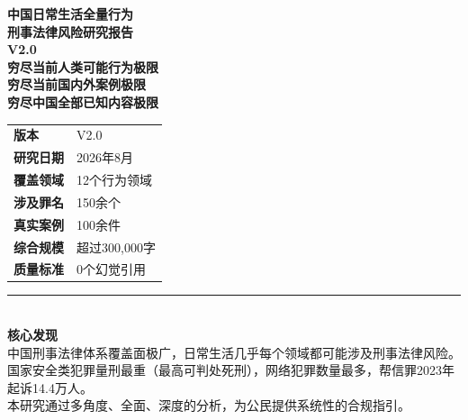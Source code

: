 \documentclass[12pt,a4paper]{article}
\begin{document}
\begin{titlepage}
\thispagestyle{empty}
\pagecolor{BackgroundColor}

\vspace*{1.5cm}

\begin{center}
\LARGE\bfseries\color{PrimaryColor}
中国日常生活全量行为\\
刑事法律风险研究报告\\[0.8cm]
\large\bfseries\color{AccentColor}
V2.0\\[0.5cm]
\normalsize\color{PrimaryColor}
穷尽当前人类可能行为极限\\
穷尽当前国内外案例极限\\
穷尽中国全部已知内容极限
\end{center}

\vspace{1.5cm}

\begin{center}
\begin{tabular}{p{3cm}p{6cm}}
\textbf{版本} & V2.0 \\
\textbf{研究日期} & 2026年8月 \\
\textbf{覆盖领域} & 12个行为领域 \\
\textbf{涉及罪名} & 150余个 \\
\textbf{真实案例} & 100余件 \\
\textbf{综合规模} & 超过300,000字 \\
\textbf{质量标准} & 0个幻觉引用
\end{tabular}
\end{center}

\vspace{2cm}

\begin{center}
\small\color{PrimaryColor}
\rule{8cm}{0.5pt}\\
\textbf{核心发现}\\
中国刑事法律体系覆盖面极广，日常生活几乎每个领域都可能涉及刑事法律风险。\\
国家安全类犯罪量刑最重（最高可判处死刑），网络犯罪数量最多，帮信罪2023年起诉14.4万人。\\
本研究通过多角度、全面、深度的分析，为公民提供系统性的合规指引。
\end{center}

\clearpage
\end{titlepage}
\end{document}
